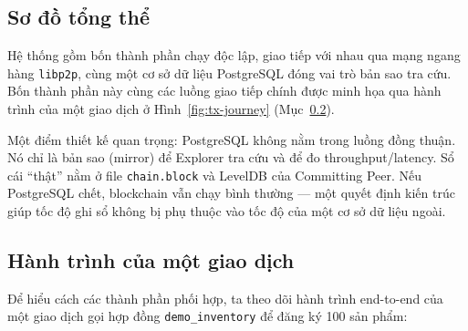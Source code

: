 \subsection{Sơ đồ tổng thể}

Hệ thống gồm bốn thành phần chạy độc lập, giao tiếp với nhau qua mạng ngang hàng
\texttt{libp2p}, cùng một cơ sở dữ liệu PostgreSQL đóng vai trò bản sao tra cứu.
Bốn thành phần này cùng các luồng giao tiếp chính được minh họa qua hành trình
của một giao dịch ở Hình~\ref{fig:tx-journey} (Mục~\ref{sec:tx-journey}).

Một điểm thiết kế quan trọng: PostgreSQL không nằm trong luồng
đồng thuận. Nó chỉ là bản sao (mirror) để Explorer tra cứu và để đo
throughput/latency. Sổ cái ``thật'' nằm ở file \texttt{chain.block} và LevelDB
của Committing Peer. Nếu PostgreSQL chết, blockchain vẫn chạy bình thường --- một
quyết định kiến trúc giúp tốc độ ghi sổ không bị phụ thuộc vào tốc độ của một cơ
sở dữ liệu ngoài.

\subsection{Hành trình của một giao dịch}
\label{sec:tx-journey}

Để hiểu cách các thành phần phối hợp, ta theo dõi hành trình end-to-end của một
giao dịch gọi hợp đồng \texttt{demo\_inventory} để đăng ký 100 sản phẩm:

